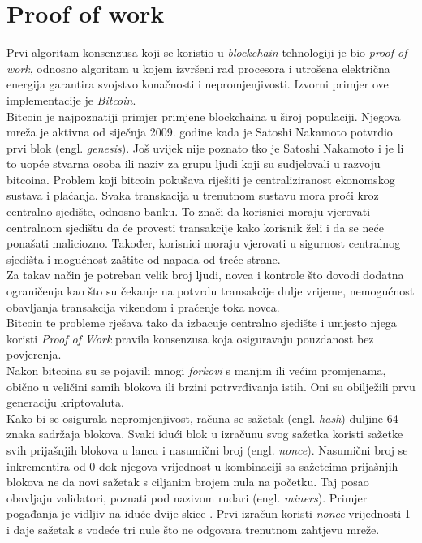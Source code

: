 \documentclass[times, utf8, zavrsni, numeric]{fer}
\begin{document}
\section{Proof of work}
Prvi algoritam konsenzusa koji se koristio u \emph{blockchain} tehnologiji je bio \emph{proof of work},
 odnosno algoritam u kojem izvršeni rad procesora i utrošena električna energija
garantira svojstvo konačnosti i nepromjenjivosti. Izvorni primjer ove implementacije je \emph{Bitcoin}. \\
Bitcoin je najpoznatiji primjer primjene blockchaina u široj populaciji. Njegova mreža je aktivna 
od siječnja 2009. godine kada je Satoshi Nakamoto potvrdio prvi blok (engl. \emph{genesis}).
Još uvijek nije poznato tko je Satoshi Nakamoto i je li to uopće stvarna osoba ili naziv za grupu
ljudi koji su sudjelovali u razvoju bitcoina. Problem koji bitcoin pokušava riješiti je centraliziranost
ekonomskog sustava i plaćanja. Svaka transkacija u trenutnom sustavu mora proći kroz centralno sjedište,
odnosno banku. To znači da korisnici moraju vjerovati centralnom sjedištu da će provesti transakcije
kako korisnik želi i da se neće ponašati maliciozno. Također, korisnici moraju vjerovati u sigurnost
centralnog sjedišta i mogućnost zaštite od napada od treće strane. \\
Za takav način je potreban velik broj ljudi, novca i kontrole što dovodi dodatna ograničenja kao što 
su čekanje na potvrdu transakcije dulje vrijeme, nemogućnost obavljanja transakcija vikendom i praćenje
toka novca. \\
Bitcoin te probleme rješava tako da izbacuje centralno sjedište i umjesto njega koristi \emph{Proof of Work}
pravila konsenzusa koja osiguravaju pouzdanost bez povjerenja. \\
Nakon bitcoina su se pojavili mnogi \emph{forkovi} s manjim ili većim promjenama, obično u veličini
samih blokova ili brzini potrvrđivanja istih. Oni su obilježili prvu generaciju kriptovaluta. \\
Kako bi se osigurala nepromjenjivost, računa se sažetak (engl. \emph{hash}) duljine 64 znaka sadržaja blokova. 
Svaki idući blok u izračunu svog sažetka koristi sažetke svih prijašnjih blokova u lancu i nasumični broj (engl. \emph{nonce}). Nasumični broj se inkrementira od 0
dok njegova vrijednost u kombinaciji sa sažetcima prijašnjih blokova ne da novi sažetak s ciljanim brojem nula na početku. Taj posao obavljaju validatori, poznati pod nazivom
rudari (engl. \emph{miners}). Primjer pogađanja je vidljiv na iduće dvije skice \citep{PoWAsync}. Prvi izračun koristi \emph{nonce} vrijednosti 1 i daje sažetak s vodeće
tri nule što ne odgovara trenutnom zahtjevu mreže.
\end{document}
